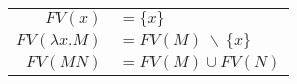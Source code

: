 \documentclass[convert={density=300,size=1080x800,outext=.png}]{standalone}
\begin{document}
\begin{tabular}{r@{ }l}
  $ FV(x) $ & $ = \{ x \} $ \\
  $ FV(\lambda x . M) $ & $ = FV(M) \ \backslash \ \{ x \} $ \\
  $ FV(M N) $ & $ = FV(M) \cup FV(N) $
\end{tabular}
\end{document}

